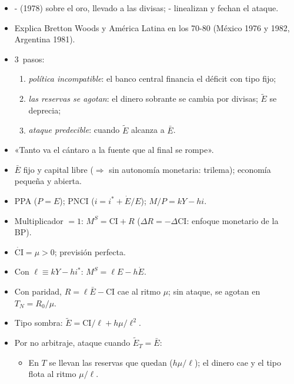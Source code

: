 \documentclass{article}
\begin{document}
\begin{columnas}
\begin{itemize}
\item {}- (1978) sobre el oro, llevado a las divisas; - linealizan y fechan el ataque.
\item Explica Bretton Woods y América Latina en los 70-80 (México 1976 y 1982, Argentina 1981).
\item 3~pasos:
  \begin{enumerate}
  \item \emph{política incompatible}: el banco central financia el déficit con tipo fijo;
  \item \emph{las reservas se agotan}: el dinero sobrante se cambia por divisas; $\tilde E$ se deprecia;
  \item \emph{ataque predecible}: cuando $\tilde E$ alcanza a $\bar E$.
  \end{enumerate}
\item «Tanto va el cántaro a la fuente que al final se rompe».
\end{itemize}
\begin{itemize}
\item $\bar E$ fijo y capital libre ($\Rightarrow$ sin autonomía monetaria: trilema); economía pequeña y abierta.
\item PPA ($P=E$); PNCI ($i=i^*+\dot E/E$); $M/P=kY-hi$.
\item Multiplicador $=1$: $M^S=\mathrm{CI}+R$ ($\Delta R=-\Delta\mathrm{CI}$: enfoque monetario de la BP).
\item $\dot{\mathrm{CI}}=\mu>0$; previsión perfecta.
\end{itemize}
\begin{itemize}
\item Con $\ell\equiv kY-hi^*$: $M^S=\ell E-h\dot E$.
\item Con paridad, $R=\ell\bar E-\mathrm{CI}$ cae al ritmo $\mu$; sin ataque, se agotan en $T_N=R_0/\mu$.
\item Tipo sombra: $\tilde E=\mathrm{CI}/\ell+h\mu/\ell^2$.
\item Por no arbitraje, ataque cuando $\tilde E_T=\bar E$:
  \begin{itemize}
  \item En $T$ se llevan las reservas que quedan ($h\mu/\ell$); el dinero cae y el tipo flota al ritmo $\mu/\ell$.

\end{itemize}
\end{itemize}
\end{columnas}
\end{document}
